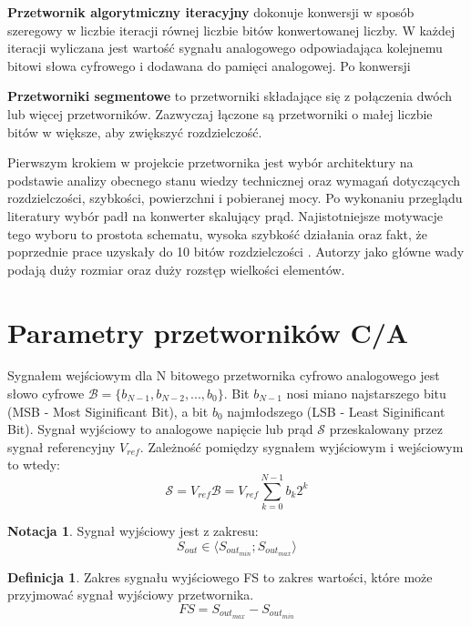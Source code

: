 \documentclass[10pt,a4paper,twoside]{report}
\theoremstyle{definition}
\newtheorem{notation}{Notacja}[section]
\theoremstyle{definition}
\newtheorem{definition}{Definicja}[section]
\theoremstyle{definition}
\theoremstyle{definition}
\theoremstyle{definition}
\begin{document}
	{	\textbf{Przetwornik algorytmiczny iteracyjny} dokonuje konwersji w sposób szeregowy w liczbie iteracji równej liczbie bitów konwertowanej liczby. W każdej iteracji wyliczana jest wartość sygnału analogowego odpowiadająca kolejnemu bitowi słowa cyfrowego i dodawana do pamięci analogowej. Po konwersji 

	{ 	\textbf{Przetworniki segmentowe} to przetworniki składające się z połączenia dwóch lub więcej przetworników. Zazwyczaj łączone są przetworniki o małej liczbie bitów w większe, aby zwiększyć rozdzielczość. }

	{	Pierwszym krokiem w projekcie przetwornika jest wybór architektury na podstawie analizy obecnego stanu wiedzy technicznej oraz wymagań dotyczących rozdzielczości, szybkości, powierzchni i pobieranej mocy. Po wykonaniu przeglądu literatury wybór padł na konwerter skalujący prąd. Najistotniejsze motywacje tego wyboru to prostota schematu, wysoka szybkość działania \cite{cmosanal} oraz fakt, że poprzednie prace uzyskały do 10 bitów rozdzielczości \cite{plassche}.	Autorzy \cite{cmosanal} jako główne wady podają duży rozmiar oraz duży rozstęp wielkości elementów.}
	
	\section{Parametry przetworników C/A}
	{	Sygnałem wejściowym dla N bitowego przetwornika cyfrowo analogowego jest słowo cyfrowe $\mathcal{B}=\{b_{N-1},b_{N-2},...,b_0\}$. Bit $b_{N-1}$ nosi miano najstarszego bitu (MSB - Most Siginificant Bit), a bit $b_0$ najmłodszego (LSB - Least Siginificant Bit). Sygnał wyjściowy to analogowe napięcie lub prąd $\mathcal{S}$ przeskalowany przez sygnał referencyjny $V_{ref}$. Zależność pomiędzy sygnałem wyjściowym i wejściowym to wtedy:
		\begin{equation}
		\mathcal{S} = V_{ref}\mathcal{B} = V_{ref} {\sum_{k=0}^{N-1} b_k2^k}
		\end{equation}	}
	
	\begin{notation}{Sygnał wyjściowy jest z zakresu:}
		$$
		S_{out} \in \langle S_{out_{min}} ;  S_{out_{max}} \rangle
		$$
	\end{notation}
	
	\begin{definition}{Zakres sygnału wyjściowego FS to zakres wartości, które może przyjmować sygnał wyjściowy przetwornika.}
		\begin{equation}
		FS = S_{out_{max}} - S_{out_{min}}
		\end{equation}
	\end{definition}
	
}
\end{document}
